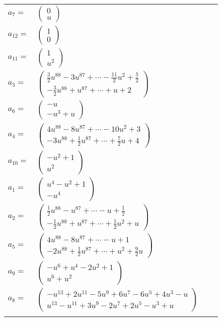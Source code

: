 \documentclass[1p]{elsarticle_modified}
\theoremstyle{definition}
\begin{document}
\begin{tabular}{m{7pt} m{180pt} m{7pt} m{180pt} }
\flushright $a_{7}=$&$\begin{pmatrix}0\\u\end{pmatrix}$ \\
\flushright $a_{12}=$&$\begin{pmatrix}1\\0\end{pmatrix}$ \\
\flushright $a_{11}=$&$\begin{pmatrix}1\\u^2\end{pmatrix}$ \\
\flushright $a_{3}=$&$\begin{pmatrix}\frac{3}{2} u^{88}-3 u^{87}+\cdots-\frac{11}{2} u^2+\frac{5}{2}\\-\frac{3}{2} u^{88}+u^{87}+\cdots+u+2\end{pmatrix}$ \\
\flushright $a_{6}=$&$\begin{pmatrix}- u\\- u^3+u\end{pmatrix}$ \\
\flushright $a_{4}=$&$\begin{pmatrix}4 u^{88}-8 u^{87}+\cdots-10 u^2+3\\-3 u^{88}+\frac{1}{2} u^{87}+\cdots+\frac{7}{2} u+4\end{pmatrix}$ \\
\flushright $a_{10}=$&$\begin{pmatrix}- u^2+1\\u^2\end{pmatrix}$ \\
\flushright $a_{1}=$&$\begin{pmatrix}u^4- u^2+1\\- u^4\end{pmatrix}$ \\
\flushright $a_{2}=$&$\begin{pmatrix}\frac{1}{2} u^{88}- u^{87}+\cdots- u+\frac{1}{2}\\-\frac{1}{2} u^{88}+u^{87}+\cdots+\frac{1}{2} u^2+u\end{pmatrix}$ \\
\flushright $a_{5}=$&$\begin{pmatrix}4 u^{88}-8 u^{87}+\cdots- u+1\\-2 u^{88}+\frac{1}{2} u^{87}+\cdots+u^2+\frac{9}{2} u\end{pmatrix}$ \\
\flushright $a_{9}=$&$\begin{pmatrix}- u^6+u^4-2 u^2+1\\u^6+u^2\end{pmatrix}$ \\
\flushright $a_{8}=$&$\begin{pmatrix}- u^{13}+2 u^{11}-5 u^9+6 u^7-6 u^5+4 u^3- u\\u^{13}- u^{11}+3 u^9-2 u^7+2 u^5- u^3+u\end{pmatrix}$\\&\end{tabular}
\end{document}
